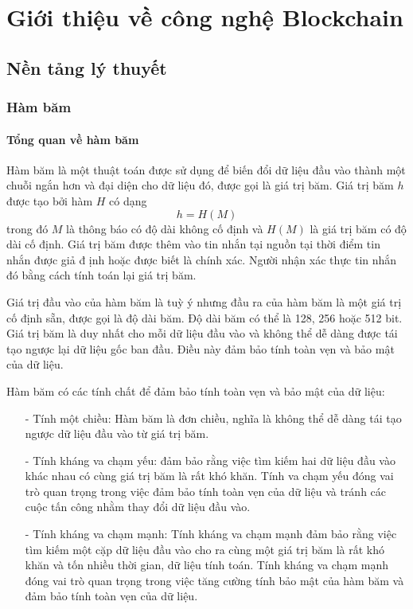 \chapter{Giới thiệu về công nghệ Blockchain}
\section{Nền tảng lý thuyết}
\subsection{Hàm băm}
\subsubsection{Tổng quan về hàm băm}
Hàm băm là một thuật toán được sử dụng để biến đổi dữ liệu đầu vào thành một chuỗi ngắn hơn và đại diện
cho dữ liệu đó, được gọi là giá trị băm.
Giá trị băm $h$ được tạo bởi hàm $H$ có dạng
$$h = H(M)$$ 
trong đó $M$ là thông báo có độ dài không cố định và $H(M)$ là giá trị băm có độ dài cố 
định. Giá trị băm được thêm vào tin nhắn tại nguồn tại thời điểm tin nhắn được giả đ
ịnh hoặc được biết là chính xác. Người nhận xác thực tin nhắn đó bằng cách tính toán 
lại giá trị băm.\cite{hashfunction}

Giá trị đầu vào của hàm băm là tuỳ ý nhưng đầu ra của hàm băm là một giá trị 
cố định sẵn, được gọi là độ dài băm. Độ dài băm có thể là 128, 256 hoặc 512 bit.
Giá trị băm là duy nhất cho mỗi dữ liệu đầu vào và không thể dễ dàng được tái tạo ngược lại dữ liệu gốc ban đầu. Điều này đảm bảo tính toàn vẹn và 
bảo mật của dữ liệu.


Hàm băm có các tính chất để đảm bảo tính toàn vẹn và bảo mật của dữ liệu:
\begin{itemize}
\item[-] Tính một chiều: Hàm băm là đơn chiều, nghĩa là không thể dễ dàng 
tái tạo ngược dữ liệu đầu vào từ giá trị băm.
\item[-] Tính kháng va chạm yếu: đảm bảo rằng việc tìm kiếm hai dữ liệu đầu vào khác nhau có cùng 
giá trị băm là rất khó khăn. Tính va chạm yếu đóng vai trò quan trọng trong việc đảm bảo tính toàn
vẹn của dữ liệu và tránh các cuộc tấn công nhằm thay đổi dữ liệu đầu vào. 
\item[-] Tính kháng va chạm mạnh:  Tính kháng va chạm mạnh đảm bảo rằng việc tìm kiếm một cặp dữ 
liệu đầu vào cho ra cùng một giá trị băm là rất khó khăn và tốn nhiều thời gian, dữ liệu tính toán.
Tính kháng va chạm mạnh đóng vai trò quan trọng trong việc tăng cường tính bảo mật của hàm băm và 
đảm bảo tính toàn vẹn của dữ liệu.
\item[] 
\end{itemize}

